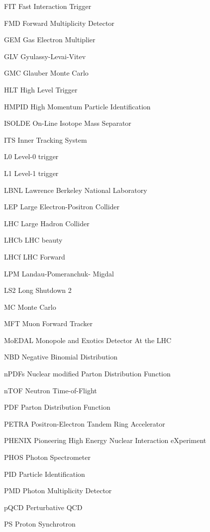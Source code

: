 \begin{abbrv}
\item[FIT]				Fast Interaction Trigger
\item[FMD]			Forward Multiplicity Detector

\item[GEM]			Gas Electron Multiplier
\item[GLV]				Gyulassy-Levai-Vitev 
\item[GMC]			Glauber Monte Carlo 

\item[HLT]				High Level Trigger 
\item[HMPID]			High Momentum Particle Identification

\item[ISOLDE]			On-Line Isotope Mass Separator
\item[ITS]				Inner Tracking System


\item[L0]				Level-0 trigger
\item[L1]				Level-1 trigger

 \item[LBNL]			Lawrence Berkeley National Laboratory
 \item[LEP]			Large Electron-Positron Collider
  \item[LHC]			Large Hadron Collider
\item[LHCb]			LHC beauty
\item[LHCf]			LHC Forward
\item[LPM]			Landau-Pomeranchuk- Migdal
\item[LS2]				Long Shutdown 2

\item[MC]				Monte Carlo
\item[MFT]			Muon Forward Tracker 
\item[MoEDAL]			Monopole and Exotics Detector At the LHC

\item[NBD]			Negative Binomial Distribution
\item[nPDFs]			Nuclear modified Parton Distribution Function
\item[nTOF]			Neutron Time-of-Flight

\item[PDF]			Parton Distribution Function
\item[PETRA]			Positron-Electron Tandem Ring Accelerator
\item[PHENIX]			Pioneering High Energy Nuclear Interaction eXperiment
\item[PHOS]			Photon Spectrometer
\item[PID]				Particle Identification
\item[PMD]			Photon Multiplicity Detector
\item[pQCD]			Perturbative QCD
\item[PS]				Proton Synchrotron


\end{abbrv}
